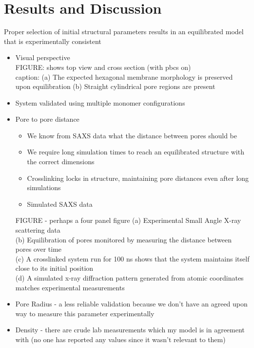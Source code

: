 \documentclass{article}
\begin{document}
	\section{Results and Discussion}
	
	Proper selection of initial structural parameters results in an equilibrated model that is experimentally consistent 
	\begin{itemize}
		\item Visual perspective \\
		FIGURE: shows top view and cross section (with pbcs on)\\
			caption: %
		(a) The expected hexagonal membrane morphology is preserved upon equilibration
		(b) Straight cylindrical pore regions are present 
		\item System validated using multiple monomer configurations 
		\item Pore to pore distance
		\begin{itemize}
			\item We know from SAXS data what the distance between pores should be
			\item We require long simulation times to reach an equilibrated structure with the correct dimensions
			\item Crosslinking locks in structure, maintaining pore distances even after long simulations
			\item Simulated SAXS data
		\end{itemize}
		FIGURE - perhaps a four panel figure
		(a) Experimental Small Angle X-ray scattering data \\
		(b) Equilibration of pores monitored by measuring the distance between pores over time \\
		(c) A crosslinked system run for 100 ns shows that the system maintains itself close to its initial position \\ 
		(d) A simulated x-ray diffraction pattern generated from atomic coordinates matches experimental measurements \\  	
		\item Pore Radius - a less reliable validation because we don't have an agreed upon way to measure this parameter experimentally
		\item Density - there are crude lab measurements which my model is in agreement with (no one has reported any values since it wasn't relevant to them)
	\end{itemize}
	
\end{document}
